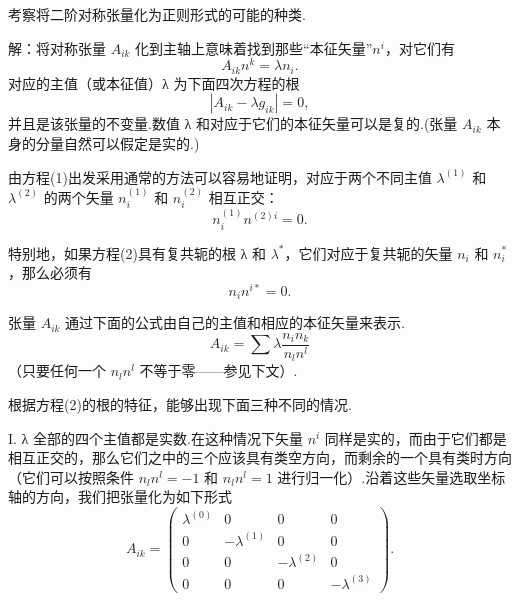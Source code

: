 \begin{xiti}

\quad 考察将二阶对称张量化为正则形式的可能的种类.

解：将对称张量 $A_{ik}$ 化到主轴上意味着找到那些“本征矢量”$n^i$，对它们有
\begin{equation*}
  A_{ik}n^k=\lambda n_i.
\tag{1}\end{equation*}
对应的主值（或本征值）λ 为下面四次方程的根
\begin{equation*}
  |A_{ik}-\lambda g_{ik}|=0,
\tag{2}\end{equation*}
并且是该张量的不变量.数值 λ 和对应于它们的本征矢量可以是复的.(张量 $A_{ik}$ 本身的分量自然可以假定是实的.)

由方程(1)出发采用通常的方法可以容易地证明，对应于两个不同主值 $\lambda^{(1)}$ 和 $\lambda^{(2)}$ 的两个矢量 $n_i^{(1)}$ 和 $n_i^{(2)}$ 相互正交：
\begin{equation*}
  n_i^{(1)}n^{(2)i}=0.
\tag{3}\end{equation*}

特别地，如果方程(2)具有复共轭的根 λ 和 $\lambda^{*}$，它们对应于复共轭的矢量 $n_i$ 和 $n_i^{*}$，那么必须有
\begin{equation*}
  n_in^{i*}=0.
\tag{4}\end{equation*}

张量 $A_{ik}$ 通过下面的公式由自己的主值和相应的本征矢量来表示.
\begin{equation*}
  A_{ik}=\sum\lambda\frac{n_in_k}{n_ln^l}
\tag{5}\end{equation*}
（只要任何一个 $n_ln^l$ 不等于零——参见下文）.

根据方程(2)的根的特征，能够出现下面三种不同的情况.

I. λ 全部的四个主值都是实数.在这种情况下矢量 $n^i$ 同样是实的，而由于它们都是相互正交的，那么它们之中的三个应该具有类空方向，而剩余的一个具有类时方向（它们可以按照条件 $n_ln^l=-1$ 和 $n_ln^l=1$ 进行归一化）.沿着这些矢量选取坐标轴的方向，我们把张量化为如下形式
\begin{equation*}
  A_{ik}=
  \begin{pmatrix}
    \lambda^{(0)} & 0 & 0 & 0\\
    0 & -\lambda^{(1)} & 0 & 0\\
    0 & 0 & -\lambda^{(2)} & 0\\
    0 & 0 & 0 & -\lambda^{(3)}
  \end{pmatrix}.
\tag{6}\end{equation*}


\end{xiti}
